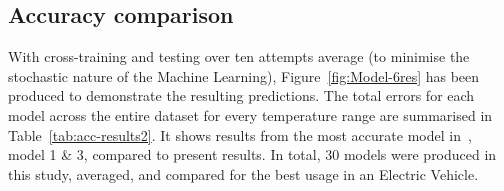 \subsection{Accuracy comparison}
With cross-training and testing over ten attempts average (to minimise the stochastic nature of the Machine Learning), Figure~\ref{fig:Model-6res} has been produced to demonstrate the resulting predictions.
The total errors for each model across the entire dataset for every temperature range are summarised in Table~\ref{tab:acc-results2}.
It shows results from the most accurate model in~\cite{sadykov_practical_2022}, model 1 \& 3, compared to present results.
In total, 30 models were produced in this study, averaged, and compared for the best usage in an Electric Vehicle.
